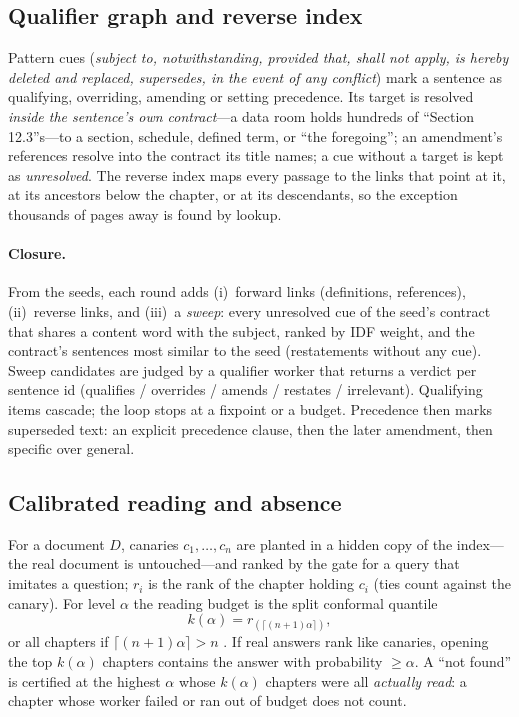 \documentclass[11pt]{article}
\begin{document}
\subsection{Qualifier graph and reverse index}
\label{sec:closure}
Pattern cues (\emph{subject to, notwithstanding, provided that, shall not apply, is hereby deleted and replaced, supersedes, in the event of any conflict}) mark a sentence as qualifying, overriding, amending or setting precedence. Its target is resolved \emph{inside the sentence's own contract}---a data room holds hundreds of ``Section 12.3''s---to a section, schedule, defined term, or ``the foregoing''; an amendment's references resolve into the contract its title names; a cue without a target is kept as \emph{unresolved}. The reverse index maps every passage to the links that point at it, at its ancestors below the chapter, or at its descendants, so the exception thousands of pages away is found by lookup.

\paragraph{Closure.} From the seeds, each round adds (i)~forward links (definitions, references), (ii)~reverse links, and (iii)~a \emph{sweep}: every unresolved cue of the seed's contract that shares a content word with the subject, ranked by IDF weight, and the contract's sentences most similar to the seed (restatements without any cue). Sweep candidates are judged by a qualifier worker that returns a verdict per sentence id (qualifies / overrides / amends / restates / irrelevant). Qualifying items cascade; the loop stops at a fixpoint or a budget. Precedence then marks superseded text: an explicit precedence clause, then the later amendment, then specific over general.

\subsection{Calibrated reading and absence}
\label{sec:absence}
For a document $D$, canaries $c_1,\dots,c_n$ are planted in a hidden copy of the index---the real document is untouched---and ranked by the gate for a query that imitates a question; $r_i$ is the rank of the chapter holding $c_i$ (ties count against the canary). For level $\alpha$ the reading budget is the split conformal quantile
\begin{equation}
k(\alpha) = r_{(\lceil (n+1)\alpha \rceil)},
\end{equation}
or all chapters if $\lceil (n+1)\alpha\rceil > n$ \citep{papadopoulos2002inductive,lei2018distribution}. If real answers rank like canaries, opening the top $k(\alpha)$ chapters contains the answer with probability $\ge \alpha$. A ``not found'' is certified at the highest $\alpha$ whose $k(\alpha)$ chapters were all \emph{actually read}: a chapter whose worker failed or ran out of budget does not count.
\end{document}
